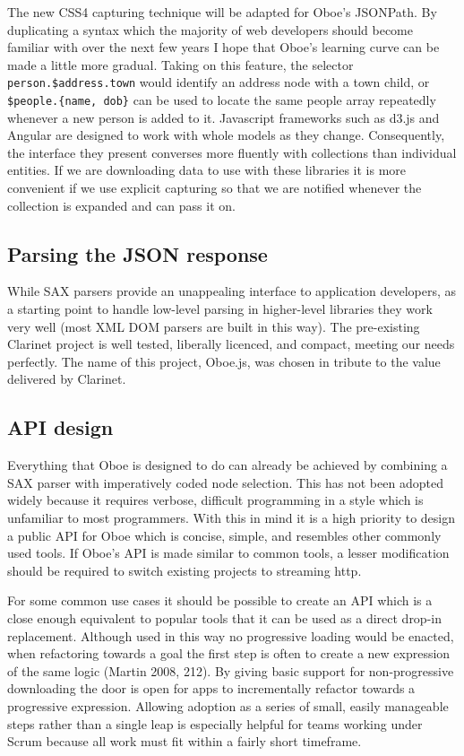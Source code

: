 \documentclass[12pt, ]{article}
\begin{document}
The new CSS4 capturing technique will be adapted for Oboe's JSONPath. By
duplicating a syntax which the majority of web developers should become
familiar with over the next few years I hope that Oboe's learning curve
can be made a little more gradual. Taking on this feature, the selector
\texttt{person.\$address.town} would identify an address node with a
town child, or \texttt{\$people.\{name, dob\}} can be used to locate the
same people array repeatedly whenever a new person is added to it.
Javascript frameworks such as d3.js and Angular are designed to work
with whole models as they change. Consequently, the interface they
present converses more fluently with collections than individual
entities. If we are downloading data to use with these libraries it is
more convenient if we use explicit capturing so that we are notified
whenever the collection is expanded and can pass it on.

\subsection{Parsing the JSON response}\label{parsing-the-json-response}

While SAX parsers provide an unappealing interface to application
developers, as a starting point to handle low-level parsing in
higher-level libraries they work very well (most XML DOM parsers are
built in this way). The pre-existing Clarinet project is well tested,
liberally licenced, and compact, meeting our needs perfectly. The name
of this project, Oboe.js, was chosen in tribute to the value delivered
by Clarinet.

\subsection{API design}\label{api-design}

Everything that Oboe is designed to do can already be achieved by
combining a SAX parser with imperatively coded node selection. This has
not been adopted widely because it requires verbose, difficult
programming in a style which is unfamiliar to most programmers. With
this in mind it is a high priority to design a public API for Oboe which
is concise, simple, and resembles other commonly used tools. If Oboe's
API is made similar to common tools, a lesser modification should be
required to switch existing projects to streaming http.

For some common use cases it should be possible to create an API which
is a close enough equivalent to popular tools that it can be used as a
direct drop-in replacement. Although used in this way no progressive
loading would be enacted, when refactoring towards a goal the first step
is often to create a new expression of the same logic (Martin 2008,
212). By giving basic support for non-progressive downloading the door
is open for apps to incrementally refactor towards a progressive
expression. Allowing adoption as a series of small, easily manageable
steps rather than a single leap is especially helpful for teams working
under Scrum because all work must fit within a fairly short timeframe.
\end{document}
